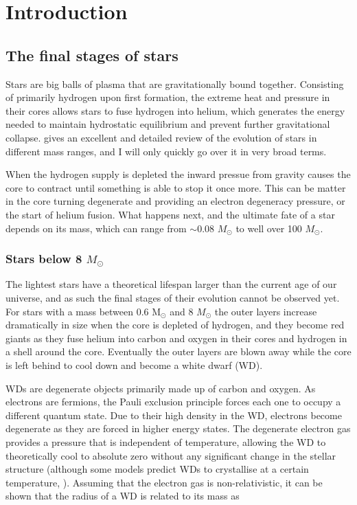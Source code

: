 \documentclass[a4paper,oneside,12pt, class=Latex/Classes/PhDthesisPSnPDF, crop=false]{standalone}
\begin{document}
\doublespacing
\chapter{Introduction}
\label{chap:intro}

\section{The final stages of stars}
Stars are big balls of plasma that are gravitationally bound together. Consisting of primarily hydrogen upon first formation, the extreme heat and pressure in their cores allows stars to fuse hydrogen into helium, which generates the energy needed to maintain hydrostatic equilibrium and prevent further gravitational collapse. \citet{starstruct} gives an excellent and detailed review of the evolution of stars in different mass ranges, and I will only quickly go over it in very broad terms.

When the hydrogen supply is depleted the inward pressue from gravity causes the core to contract until something is able to stop it once more. This can be matter in the core turning degenerate and providing an electron degeneracy pressure, or the start of helium fusion. What happens next, and the ultimate fate of a star depends on its mass, which can range from $\sim0.08$ $M_\odot$ to well over 100 $M_\odot$.


\subsection{Stars below 8 $M_\odot$}
\label{interm_mass_stars}
The lightest stars have a theoretical lifespan larger than the current age of our universe, and as such the final stages of their evolution cannot be observed yet. For stars with a mass between 0.6 M$_\odot$ and 8 $M_\odot$ the outer layers increase dramatically in size when the core is depleted of hydrogen, and they become red giants as they fuse helium into carbon and oxygen in their cores and hydrogen in a shell around the core. Eventually the outer layers are blown away while the core is left behind to cool down and become a white dwarf (WD).

WDs are degenerate objects primarily made up of carbon and oxygen. As electrons are fermions, the Pauli exclusion principle \citep{Pauli} forces each one to occupy a different quantum state. Due to their high density in the WD, electrons become degenerate as they are forced in higher energy states. The degenerate electron gas provides a pressure that is independent of temperature, allowing the WD to theoretically cool to absolute zero without any significant change in the stellar structure (although some models predict WDs to crystallise at a certain temperature, \citealt{WD_crystal_Mochkovitch, WD_crystal_Isern}). Assuming that the electron gas is non-relativistic, it can be shown that the radius of a WD is related to its mass as
\end{document}
